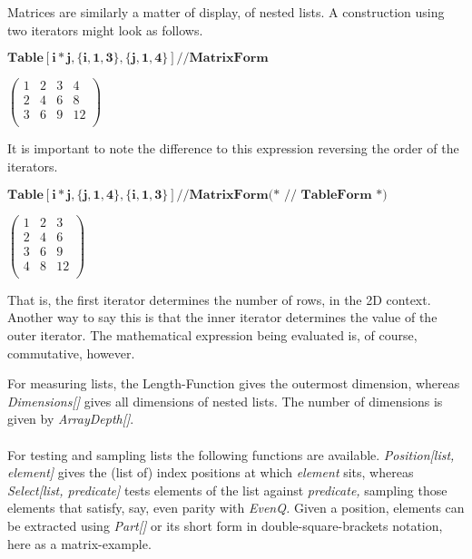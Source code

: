 \documentclass{article}
\begin{document}
Matrices are similarly a matter of display, of nested lists. A construction using two iterators might look as follows.

\begin{doublespace}
\noindent\(\pmb{\text{Table}[i * j, \{i,1,3\},\{j,1,4\}] \text{//} \text{MatrixForm}}\)
\end{doublespace}

\begin{doublespace}
\noindent\(\left(
\begin{array}{cccc}
 1 & 2 & 3 & 4 \\
 2 & 4 & 6 & 8 \\
 3 & 6 & 9 & 12 \\
\end{array}
\right)\)
\end{doublespace}

It is important to note the difference to this expression reversing the order of the iterators.

\begin{doublespace}
\noindent\(\pmb{\text{Table}[i * j,\{j,1,4\},\{i,1,3\}] \text{//} \text{MatrixForm} \text{(* // TableForm *)}}\)
\end{doublespace}

\begin{doublespace}
\noindent\(\left(
\begin{array}{ccc}
 1 & 2 & 3 \\
 2 & 4 & 6 \\
 3 & 6 & 9 \\
 4 & 8 & 12 \\
\end{array}
\right)\)
\end{doublespace}

That is, the first iterator determines the number of rows, in the 2D context. Another way to say this is that the inner iterator determines the value
of the outer iterator. The mathematical expression being evaluated is, of course, commutative, however.

For measuring lists, the Length-Function gives the outermost dimension, whereas \textit{ Dimensions[]} gives all dimensions of nested lists. The
number of dimensions is given by \textit{ ArrayDepth[]}.\\
\\
For testing and sampling lists the following functions are available. \textit{ Position[list, element] }gives the (list of) index positions at which
\textit{ element }sits, whereas \textit{ Select[list, predicate] }tests elements of the list against \textit{ predicate, }sampling those elements
that satisfy, say, even parity with \textit{ EvenQ. }Given a position, elements can be extracted using \textit{ Part[] }or its short form in double-square-brackets
notation, here as a matrix-example.
\end{document}
